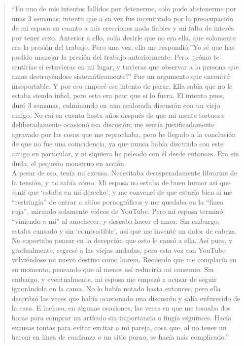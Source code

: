 \documentclass[
  spanish,
  openany]{book}
\begin{document}
\begin{quote}
``En uno de mis intentos fallidos por detenerme, solo pude abstenerme por unas 3 semanas; intento que a su vez fue incentivado por la preocupación de mi esposa en cuanto a mis erecciones nada fiables y mi falta de interés por tener sexo. Anterior a ello, solía decirle que no era ella, que solamente era la presión del trabajo. Pero una vez, ella me respondió:''Yo sé que has podido manejar la presión del trabajo anteriormente. Pero: ¿cómo te sentirías si estuvieras en mi lugar, y tuvieras que observar a la persona que amas destruyéndose sistemáticamente?" Fue un argumento que encontré insoportable. Y por eso empecé ese intento de parar. Ella sabía que no le estaba siendo infiel, pero esto era peor que si lo fuera. El intento pues, duró 3 semanas, culminando en una acalorada discusión con un viejo amigo. No caí en cuenta hasta años después de que mi mente tortuosa deliberadamente ocasionó esa discusión; me sentía justificadamente agravado por las cosas que me reprochaba, pero he llegado a la conclusión de que no fue una coincidencia, ya que nunca había discutido con este amigo en particular, y ni siquiera he peleado con él desde entonces. Era sin duda, el pequeño monstruo en acción.\\
A pesar de eso, tenía mi excusa. Necesitaba desesperadamente librarme de la tensión, y no sabía cómo. Mi esposa no estaba de buen humor así que sentí que `estaba en mi derecho', y me convencí de que estaría bien si me ``restringía'' de entrar a sitios pornográficos y me quedaba en la ``línea roja'', mirando solamente videos de YouTube. Pero mi esposa terminó ``viniendo a mí'' al anochecer, y deseaba hacer el amor. Sin embargo, estaba cansado y sin `combustible', así que me inventé un dolor de cabeza. No soportaba pensar en la decepción que esto le causó a ella. Así pues, y gradualmente, regresé a las viejas andadas, pero esta vez con YouTube volviéndose mi nuevo destino como harem. Recuerdo que me complacía en su momento, pensando que al menos así reduciría mi consumo. Sin embargo, y eventualmente, mi esposa me empezó a acusar de seguir ignorándola en la cama. No lo había notado hasta entonces, pero ella describió las veces que había ocasionado una discusión y salía enfurecido de la casa. E incluso, en algunas ocasiones, las veces en que me tomaba dos horas para comprar un artículo sin importancia o fingía esguinces. Hacía excusas tontas para evitar excitar a mi pareja, cosa que, al no tener un harem en línea de confianza o un sitio porno, se hacía más complicado.''
\end{quote}
\end{document}
